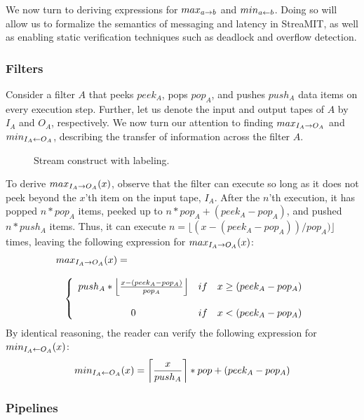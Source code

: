 We now turn to deriving expressions for $max_{a \rightarrow b}$ and $min_{a \leftarrow b}$.
Doing so will allow us to formalize the semantics of messaging and
latency in StreaMIT, as well as enabling static verification
techniques such as deadlock and overflow detection.

\subsubsection{Filters}

Consider a filter $A$ that peeks $peek_A$, pops $pop_A$, and pushes
$push_A$ data items on every execution step.  Further, let us denote
the input and output tapes of $A$ by $I_A$ and $O_A$, respectively.
We now turn our attention to finding $max_{I_A \rightarrow O_A}$ and
$min_{I_A \leftarrow O_A}$, describing the transfer of information across the
filter $A$.

\begin{figure}
\centering
{}
\caption{\protect\small Stream construct with labeling.
\protect\label{fig:pipelinelabel}}
\end{figure}

To derive $max_{I_A \rightarrow O_A}(x)$, observe that the filter can execute so
long as it does not peek beyond the $x$'th item on the input tape,
$I_A$.  After the $n$'th execution, it has popped $n*pop_A$ items,
peeked up to $n*pop_A + (peek_A - pop_A)$, and pushed $n*push_A$
items.  Thus, it can execute $n = \lfloor(x - (peek_A - pop_A)) /
pop_A)\rfloor$ times, leaving the following expression for
$max_{I_A \rightarrow O_A}(x)$:
\[
\begin{array}{l}
\ma{I_A}{O_A}(x) = \\ \\
\makebox[.1in]{ } \left\{
\begin{array}{ccl}
push_A*\left\lfloor\frac{x-(peek_A-pop_A)}{pop_A}\right\rfloor & if & x \ge (peek_A-pop_A) \\
 & \\
0 & if & x < (peek_A-pop_A) \\
\end{array} \right.
\end{array}
\]
By identical reasoning, the reader can verify the following
expression for $min_{I_A \leftarrow O_A}(x)$:
\begin{align*}
min_{I_A \leftarrow O_A}(x) = \left\lceil\frac{x}{push_A}\right\rceil*pop+(peek_A-pop_A)
\end{align*}
\subsubsection{Pipelines}

